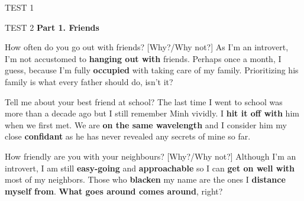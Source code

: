 \begin{glossarymc}[Cambridge 11]
\begin{test}{TEST 1}
\begin{VocabHighlights}
    \end{VocabHighlights}
    \end{test}

    \begin{test}{TEST 2}
    \noindent
    \textbf{Part 1. Friends}
    \begin{qa}{How often do you go out with friends? [Why?/Why not?]}
    As I’m an introvert, I’m not accustomed to \textbf{hanging out with} friends. Perhaps once a month, I guess, because I’m fully \textbf{occupied} with taking care of my family. Prioritizing his family is what every father should do, isn’t it?
    \end{qa}

    \begin{qa}{Tell me about your best friend at school?}
    The last time I went to school was more than a decade ago but I still remember Minh vividly. I \textbf{hit it off with} him when we first met. We are \textbf{on the same wavelength} and I consider him my close \textbf{confidant} as he has never revealed any secrets of mine so far.
    \end{qa}

    \begin{qa}{How friendly are you with your neighbours? [Why?/Why not?]}
    Although I’m an introvert, I am still \textbf{easy-going} and \textbf{approachable} so I can \textbf{get on well with} most of my neighbors. Those who \textbf{blacken} my name are the ones I \textbf{distance myself from}. \textbf{What goes around comes around}, right?
    \end{qa}


\end{test}
\end{glossarymc}
